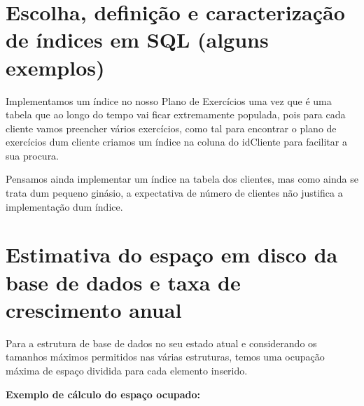 \section{Escolha, definição e caracterização de índices em SQL (alguns exemplos)}
Implementamos um índice no nosso Plano de Exercícios uma vez que é uma tabela que ao longo do tempo vai ficar extremamente populada, pois para cada cliente vamos preencher vários exercícios, como tal para encontrar o plano de exercícios dum cliente criamos um índice na coluna do idCliente para facilitar a sua procura.
\par Pensamos ainda implementar um índice na tabela dos clientes, mas como ainda se trata dum pequeno ginásio, a expectativa de número de clientes não justifica a implementação dum índice. 

\clearpage
\section{Estimativa do espaço em disco da base de dados e taxa de crescimento anual}
Para a estrutura de base de dados no seu estado atual e considerando os tamanhos máximos permitidos nas várias estruturas, temos uma ocupação máxima  de espaço dividida para cada elemento inserido.

\vspace{15pt}
\noindent
\textbf{Exemplo de cálculo do espaço ocupado:}

